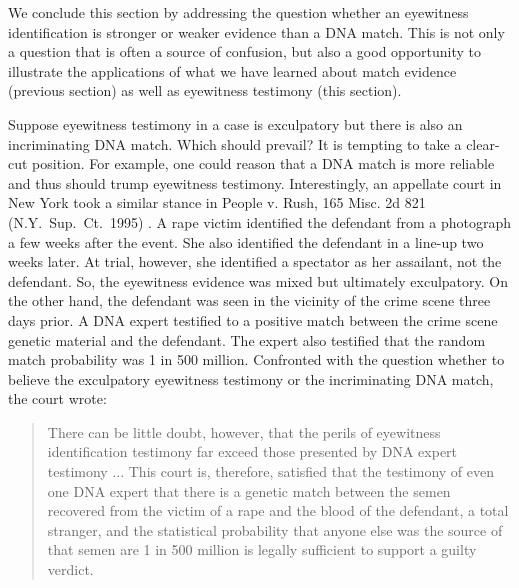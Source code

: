 \documentclass[
  letterpaper,
  DIV=11,
  numbers=noendperiod]{scrartcl}
\begin{document}
We conclude this section by addressing the question whether an
eyewitness identification is stronger or weaker evidence than a DNA
match. This is not only a question that is often a source of confusion,
but also a good opportunity to illustrate the applications of what we
have learned about match evidence (previous section) as well as
eyewitness testimony (this section).

Suppose eyewitness testimony in a case is exculpatory but there is also
an incriminating DNA match. Which should prevail? It is tempting to take
a clear-cut position. For example, one could reason that a DNA match is
more reliable and thus should trump eyewitness testimony. Interestingly,
an appellate court in New York took a similar stance in People v. Rush,
165 Misc. 2d 821 (N.Y.~Sup.~Ct.~1995) . A rape victim identified the
defendant from a photograph a few weeks after the event. She also
identified the defendant in a line-up two weeks later. At trial,
however, she identified a spectator as her assailant, not the defendant.
So, the eyewitness evidence was mixed but ultimately exculpatory. On the
other hand, the defendant was seen in the vicinity of the crime scene
three days prior. A DNA expert testified to a positive match between the
crime scene genetic material and the defendant. The expert also
testified that the random match probability was 1 in 500 million.
Confronted with the question whether to believe the exculpatory
eyewitness testimony or the incriminating DNA match, the court wrote:

\begin{quote}
There can be little doubt, however, that the perils of eyewitness identification testimony far exceed those presented by DNA expert testimony ... This court is, therefore, satisfied that the testimony of even one DNA expert that there is a genetic match between the semen recovered from the victim of a rape and the blood of the defendant, a total stranger, and the statistical probability that anyone else was the source of that semen are 1 in 500 million is legally sufficient to support a guilty verdict.
\end{quote}

\noindent
\end{document}
